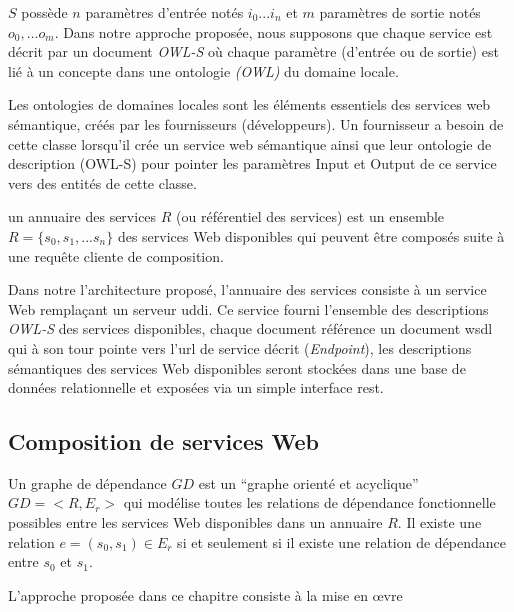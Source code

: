    $S$ possède $n$ paramètres d'entrée notés $i_0...i_n$ et $m$
   paramètres de sortie notés $o_0,...o_m$. Dans notre approche
   proposée, nous supposons que chaque service est décrit par un
   document \textit{OWL-S} où chaque paramètre (d'entrée ou de sortie)
   est lié à un concepte dans une ontologie \textit{(OWL)} du domaine
   locale.\medskip

   Les ontologies de domaines locales sont les éléments essentiels des
   services web sémantique, créés par les fournisseurs
   (développeurs). Un fournisseur a besoin de cette classe lorsqu’il
   crée un service web sémantique ainsi que leur ontologie de
   description (OWL-S) pour pointer les paramètres Input et Output de
   ce service vers des entités de cette classe.

   \begin{mydef} un annuaire des
     services $R$ (ou référentiel des services) est un ensemble $R
     =\{s_0, s_1, ...s_n\}$ des services Web disponibles qui peuvent
     être composés suite à une requête cliente de composition.
  \end{mydef}

  Dans notre l'architecture proposé, l'annuaire des services consiste
  à un service Web remplaçant un serveur \acrshort{uddi}. Ce service
  fourni l'ensemble des descriptions \textit{OWL-S} des services
  disponibles, chaque document référence un document \acrshort{wsdl}
  qui à son tour pointe vers l'\acrshort{url} de service décrit
  (\textit{Endpoint}), les descriptions sémantiques des services Web
  disponibles seront stockées dans une base de données relationnelle
  et exposées via un simple interface \acrshort{rest}.\medskip

  \subsection{Composition de services Web}
  \label{sec:basic:composition}
  \begin{mydef} Un graphe de dépendance
    $GD$ est un ``graphe orienté et acyclique'' $GD=<R, E_r>$ qui
    modélise toutes les relations de dépendance fonctionnelle
    possibles entre les services Web disponibles dans un annuaire
    $R$. Il existe une relation $e=(s_0, s_1) \in E_r$ si et seulement
    si il existe une relation de dépendance entre $s_0$ et $s_1$.
  \end{mydef}

  L'approche proposée dans ce chapitre consiste à la mise en œvre

